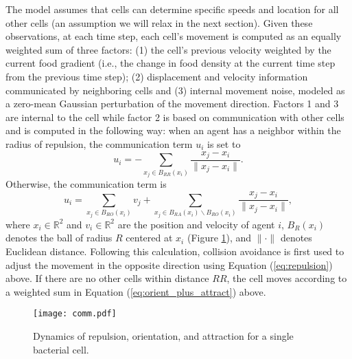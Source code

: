 \documentclass{article}
\newcommand{\sminus}{\backslash}                    %
\newcommand{\R}{\mathbb{R}}                         %
\begin{document}
The model assumes that cells can determine specific speeds and location for all
other cells (an assumption we will relax in the next section). Given these
observations, at each time step, each cell's movement is computed as an equally
weighted sum of three factors: (1) the cell's previous velocity weighted by the
current food gradient (i.e., the change in food density at the current time
step from the previous time step); (2) displacement and velocity information
communicated by neighboring cells and (3) internal movement noise, modeled as a
zero-mean Gaussian perturbation of the movement direction. Factors 1 and 3 are
internal to the cell while factor 2 is based on communication with other cells
and is computed in the following way: when an agent has a neighbor within the
radius of repulsion, the communication term $u_i$ is set to
\begin{equation}
u_i = - \sum_{x_j \in B_{RR}(x_i)} \frac{x_j - x_i}{\|x_j - x_i\|}.
\label{eq:repulsion}
\end{equation}
Otherwise, the communication term is
\begin{equation}
u_i = \sum_{x_j \in B_{RO}(x_i)} v_j
    + \sum_{x_j \in B_{RA}(x_i)\sminus B_{RO}(x_i)}
                                \frac{x_j - x_i}{\|x_j - x_i\|},
\label{eq:orient_plus_attract}
\end{equation}
where $x_i \in \R^2$ and $v_i \in \R^2$ are the position and velocity of agent
$i$, $B_R(x_i)$ denotes the ball of radius $R$ centered at $x_i$ (Figure
\ref{fig:comm}), and $\|\cdot\|$ denotes Euclidean distance. Following this
calculation, collision avoidance is first used to adjust the movement in the
opposite direction using Equation (\ref{eq:repulsion}) above. If there are no
other cells within distance $RR$, the cell moves according to a weighted sum in
Equation (\ref{eq:orient_plus_attract}) above.
\begin{figure}[h!]
\begin{center}
\texttt{[image: comm.pdf]}
\end{center}
\vspace{-3mm}
\caption{Dynamics of repulsion, orientation, and attraction for a single
bacterial cell.}
\label{fig:comm}
\end{figure}
\end{document}
